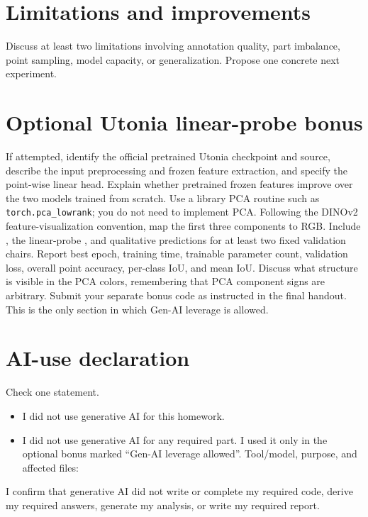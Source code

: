 \documentclass[11pt]{article}
\begin{document}
\section{Limitations and improvements}
Discuss at least two limitations involving annotation quality, part imbalance,
point sampling, model capacity, or generalization. Propose one concrete next
experiment.

\section*{Optional Utonia linear-probe bonus}
If attempted, identify the official pretrained Utonia checkpoint and source,
describe the input preprocessing and frozen feature extraction, and specify
the point-wise linear head. Explain whether pretrained frozen features improve
over the two models trained from scratch. Use a library PCA routine such as
\texttt{torch.pca\_lowrank}; you do not need to implement PCA. Following the
DINOv2 feature-visualization convention, map the first three components to RGB.
Include , the
linear-probe , and qualitative predictions for at
least two fixed validation chairs. Report best epoch, training time, trainable
parameter count, validation loss, overall point accuracy, per-class IoU, and
mean IoU. Discuss what structure is visible in the PCA colors, remembering
that PCA component signs are arbitrary. Submit your separate bonus code as
instructed in the final handout. This is the only section in which Gen-AI
leverage is allowed.

\section*{AI-use declaration}
Check one statement.

\begin{itemize}
  \item[$\square$] I did not use generative AI for this homework.
  \item[$\square$] I did not use generative AI for any required part. I used it
  only in the optional bonus marked ``Gen-AI leverage allowed''. Tool/model,
  purpose, and affected files: \underline{\hspace{1.4in}}
\end{itemize}

I confirm that generative AI did not write or complete my required code,
derive my required answers, generate my analysis, or write my required report.
\end{document}
